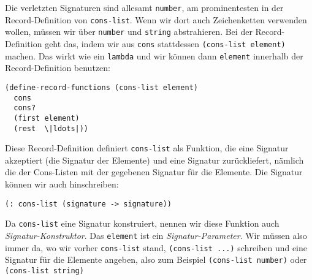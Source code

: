 Die verletzten Signaturen sind allesamt \lstinline{number}, am
prominentesten in der Record-Definition von \lstinline{cons-list}.
Wenn wir dort auch Zeichenketten verwenden wollen, müssen wir über
\lstinline{number} und \lstinline{string} abstrahieren.  Bei der
Record-Definition geht das, indem wir aus \lstinline{cons} stattdessen
\lstinline{(cons-list element)} machen.
Das wirkt wie ein
\lstinline{lambda} und wir können dann \lstinline{element} innerhalb
der Record-Definition benutzen:
%
\begin{lstlisting}
(define-record-functions (cons-list element)
  cons
  cons?
  (first element)
  (rest  \|ldots|))
\end{lstlisting}
%
Diese Record-Definition definiert \lstinline{cons-list} als Funktion,
die eine Signatur akzeptiert (die Signatur der Elemente) und eine
Signatur zurückliefert, nämlich die der Cons-Listen mit der gegebenen
Signatur für die Elemente.  Die Signatur können wir auch hinschreiben:
%
\begin{lstlisting}
(: cons-list (signature -> signature))
\end{lstlisting}
%
Da \lstinline{cons-list} eine Signatur konstruiert, nennen wir diese
Funktion auch \textit{Signatur-Konstruktor}.
Das \lstinline{element} ist ein \textit{Signatur-Parameter}.
Wir müssen also immer da, wo wir vorher \lstinline{cons-list} stand,
\lstinline{(cons-list ...)} schreiben und eine Signatur für die
Elemente angeben, also zum Beispiel \lstinline{(cons-list number)}
oder \lstinline{(cons-list string)}

